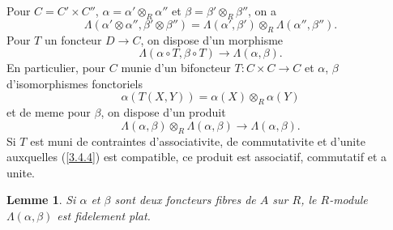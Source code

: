 \documentclass[11pt,a4paper]{article}
\theoremstyle{plain}
\newtheorem{lemma}[theorem]{Lemme}
\theoremstyle{definition}
\begin{document}
Pour $C=C'\times C''$, $\alpha=\alpha'\otimes_R\alpha''$ et $\beta=\beta'\otimes_R\beta''$, on a
\[
\Lambda(\alpha'\otimes\alpha'',\beta'\otimes\beta'')=\Lambda(\alpha',\beta')\otimes_R\Lambda(\alpha'',\beta'').
\]
Pour $T$ un foncteur $D\to C$, on dispose d'un morphisme
\[
\Lambda(\alpha\circ T,\beta\circ T)\to\Lambda(\alpha,\beta).
\]
En particulier, pour $C$ munie d'un bifoncteur $T:C\times C\to C$ et $\alpha$, $\beta$ d'isomorphismes fonctoriels
\begin{equation}\label{3.4.4}
\alpha(T(X,Y))=\alpha(X)\otimes_R\alpha(Y)
\end{equation}
et de meme pour $\beta$, on dispose d'un produit
\begin{equation}\label{3.4.5}
\Lambda(\alpha,\beta)\otimes_R\Lambda(\alpha,\beta)\to\Lambda(\alpha,\beta).
\end{equation}
Si $T$ est muni de contraintes d'associativite, de commutativite et d'unite auxquelles (\ref{3.4.4}) est compatible, ce produit est associatif, commutatif et a unite.

\begin{lemma}\label{3.5}
Si $\alpha$ et $\beta$ sont deux foncteurs fibres de $A$ sur $R$, le $R$-module $\Lambda(\alpha,\beta)$ est fidelement plat.
\end{lemma}
\end{document}
